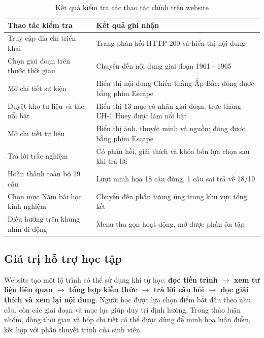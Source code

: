 \begin{table}[H]
\centering
\begingroup\small{}\renewcommand{\arraystretch}{1.25}\setlength{\extrarowheight}{2pt}
\begin{tabularx}{\textwidth}{|>{\raggedright\arraybackslash}p{}|L|}
\hline
\textbf{Thao tác kiểm tra} & \textbf{Kết quả ghi nhận} \\
\hline
Truy cập địa chỉ triển khai & Trang phản hồi HTTP 200 và hiển thị nội dung \\
\hline
Chọn giai đoạn trên thước thời gian & Chuyển đến nội dung giai đoạn 1961 - 1965 \\
\hline
Mở chi tiết sự kiện & Hiển thị nội dung Chiến thắng Ấp Bắc; đóng được bằng phím Escape \\
\hline
Duyệt kho tư liệu và thẻ nổi bật & Hiển thị 13 mục có nhãn giai đoạn; trực thăng UH-1 Huey được làm nổi bật \\
\hline
Mở chi tiết tư liệu & Hiển thị ảnh, thuyết minh và nguồn; đóng được bằng phím Escape \\
\hline
Trả lời trắc nghiệm & Có phản hồi, giải thích và khóa bốn lựa chọn sau khi trả lời \\
\hline
Hoàn thành toàn bộ 19 câu & Lượt minh họa 18 câu đúng, 1 câu sai trả về 18/19 \\
\hline
Chọn mục Năm bài học kinh nghiệm & Chuyển đến phần tương ứng trong khu vực tổng kết \\
\hline
Điều hướng trên khung nhìn di động & Menu thu gọn hoạt động, mở được phần ôn tập \\
\hline
\end{tabularx}
\endgroup
\caption{Kết quả kiểm tra các thao tác chính trên website}
\label{tab:web-2}
\end{table}

\subsection{Giá trị hỗ trợ học tập}

Website tạo một lộ trình có thể sử dụng khi tự học: \textbf{đọc tiến trình \ensuremath{\rightarrow} xem tư liệu liên quan \ensuremath{\rightarrow} tổng hợp kiến thức \ensuremath{\rightarrow} trả lời câu hỏi \ensuremath{\rightarrow} đọc giải thích và xem lại nội dung}. Người học được lựa chọn điểm bắt đầu theo nhu cầu, còn các giai đoạn và mục lục giúp duy trì định hướng. Trong thảo luận nhóm, dòng thời gian và hộp chi tiết có thể được dùng để minh họa luận điểm, kết hợp với phần thuyết trình của sinh viên.

